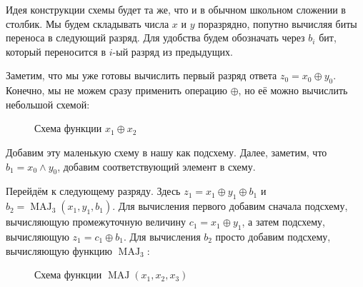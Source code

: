 \documentclass[a4paper]{article}
\theoremstyle{named}
\DeclareMathOperator{\MAJ}{\mathrm{MAJ}}
\begin{document}
\begin{colloq}
        Идея конструкции схемы будет та же, что и в обычном школьном сложении в столбик. Мы будем складывать числа $x$ и $y$ поразрядно, попутно вычисляя биты переноса в следующий разряд. Для удобства будем обозначать через $b_i$ бит, который переносится в $i$-ый разряд из предыдущих.

        Заметим, что мы уже готовы вычислить первый разряд ответа $z_0 = x_0 \oplus y_0$. Конечно, мы не можем сразу применить операцию $\oplus$, но её можно вычислить небольшой схемой:
        \begin{figure}[H]
            \centering
            \caption{Схема функции $x_1 \oplus x_2$}
        \end{figure}
        
        Добавим эту маленькую схему в нашу как подсхему. Далее, заметим, что $b_1 = x_0 \land y_0$, добавим соответствующий элемент в схему.
        
        Перейдём к следующему разряду. Здесь $z_1 = x_1 \oplus y_1 \oplus b_1$ и $b_2 = \MAJ_3(x_1, y_1 , b_1)$. Для вычисления первого добавим сначала подсхему, вычисляющую промежуточную величину $c_1 = x_1 \oplus y_1$, а затем подсхему, вычисляющую $z_1 = c_1 \oplus b_1$. Для вычисления $b_2$ просто добавим подсхему, вычисляющую функцию $\MAJ_3$:
        \begin{figure}[H]
            \centering
            \caption{Схема функции $\MAJ(x_1, x_2, x_3)$}
        \end{figure}
        

\end{colloq}
\end{document}
